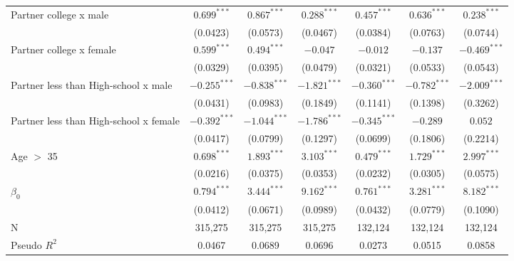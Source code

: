 \begin{tabular}{l|ccc|ccc}
Partner college x male                 &   $0.699^{***}$ &   $0.867^{***}$ &   $0.288^{***}$ &          $0.457^{***}$ &   $0.636^{***}$ &   $0.238^{***}$ \\
                                       &        (0.0423) &        (0.0573) &        (0.0467) &               (0.0384) &        (0.0763) &        (0.0744) \\
Partner college x female               &   $0.599^{***}$ &   $0.494^{***}$ &        $-0.047$ &               $-0.012$ &        $-0.137$ &  $-0.469^{***}$ \\
                                       &        (0.0329) &        (0.0395) &        (0.0479) &               (0.0321) &        (0.0533) &        (0.0543) \\
Partner less than High-school x male   &  $-0.255^{***}$ &  $-0.838^{***}$ &  $-1.821^{***}$ &         $-0.360^{***}$ &  $-0.782^{***}$ &  $-2.009^{***}$ \\
                                       &        (0.0431) &        (0.0983) &        (0.1849) &               (0.1141) &        (0.1398) &        (0.3262) \\
Partner less than High-school x female &  $-0.392^{***}$ &  $-1.044^{***}$ &  $-1.786^{***}$ &         $-0.345^{***}$ &        $-0.289$ &         $0.052$ \\
                                       &        (0.0417) &        (0.0799) &        (0.1297) &               (0.0699) &        (0.1806) &        (0.2214) \\
Age $>$ 35                             &   $0.698^{***}$ &   $1.893^{***}$ &   $3.103^{***}$ &          $0.479^{***}$ &   $1.729^{***}$ &   $2.997^{***}$ \\
                                       &        (0.0216) &        (0.0375) &        (0.0353) &               (0.0232) &        (0.0305) &        (0.0575) \\
$\beta_0$                              &   $0.794^{***}$ &   $3.444^{***}$ &   $9.162^{***}$ &          $0.761^{***}$ &   $3.281^{***}$ &   $8.182^{***}$ \\
                                       &        (0.0412) &        (0.0671) &        (0.0989) &               (0.0432) &        (0.0779) &        (0.1090) \\
N                                      &         315,275 &         315,275 &         315,275 &                132,124 &         132,124 &         132,124 \\
Pseudo $R^2$                           &          0.0467 &          0.0689 &          0.0696 &                 0.0273 &          0.0515 &          0.0858 \\
\bottomrule
\end{tabular}
